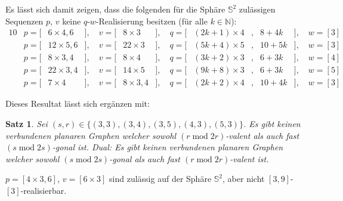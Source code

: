 \documentclass[10pt, notheorems]{beamer}
\newtheorem{theorem}{Satz}[section]
\newcommand{\set}[1]{\{ #1 \}}
\newcommand{\nats}{\mathbb{N}}
\newcommand{\sphere}{\mathbb{S}}
\renewcommand{\mod}{\operatorname{mod}}
\begin{document}
\begin{frame}
  \begin{example}
    Es lässt sich damit zeigen, dass die folgenden für die Sphäre $\sphere^2$ zulässigen Sequenzen $p$, $v$ keine $q$-$w$-Realisierung besitzen (für alle $k \in \nats$):
    \begin{alignat*}{10}
      &p = [& 6 \times 4, 6&], \quad v = [& 8 \times 3   &], \quad q = [&(2k + 1) \times 4&,{} & 8 + 4k&], \quad w = [3]\\
      &p = [&12 \times 5, 6&], \quad v = [&22 \times 3   &], \quad q = [&(5k + 4) \times 5&,{} &10 + 5k&], \quad w = [3]\\
      &p = [& 8 \times 3, 4&], \quad v = [& 8 \times 4   &], \quad q = [&(3k + 2) \times 3&,{} & 6 + 3k&], \quad w = [4]\\
      &p = [&22 \times 3, 4&], \quad v = [&14 \times 5   &], \quad q = [&(9k + 8) \times 3&,{} & 6 + 3k&], \quad w = [5]\\
      &p = [& 7 \times 4   &], \quad v = [& 8 \times 3, 4&], \quad q = [&(2k + 2) \times 4&,{} &10 + 4k&], \quad w = [3]
    \end{alignat*}
    
  \end{example}
\end{frame}

\begin{frame}
  Dieses Resultat lässt sich ergänzen mit:
  \begin{theorem}
    Sei $(s, r) \in \set{(3, 3), (3, 4), (3, 5), (4, 3), (5, 3)}$. Es gibt keinen verbundenen planaren Graphen welcher sowohl $(r \mod 2r)$-valent als auch fast $(s \mod 2s)$-gonal ist. Dual: Es gibt keinen verbundenen planaren Graphen welcher sowohl $(s \mod 2s)$-gonal als auch fast $(r \mod 2r)$-valent ist. 
  \end{theorem}

  \begin{example}
    $p = [4 \times 3, 6]$, $v = [6 \times 3]$ sind zulässig auf der Sphäre $\sphere^2$, aber nicht $[3, 9]$-$[3]$-realisierbar.
  \end{example}
\end{frame}
\end{document}
